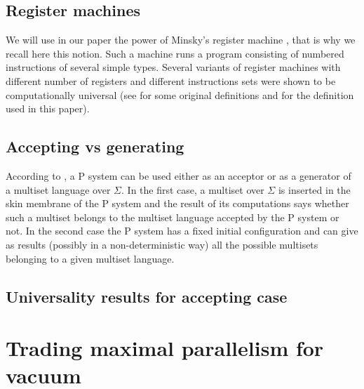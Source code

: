 \documentclass[a4paper,10pt]{article}
\begin{document}


\subsection{Register machines} %
\label{sub:register_machines}
  We will use in our paper the power of Minsky's register machine \cite{Ionescu:jucs_10_5:on_p_systems_with}, that is why we recall here this notion. Such a machine runs a program consisting of numbered instructions of several simple types. Several variants of register machines with different number of registers and different instructions sets were shown to be computationally universal (see \cite{Ibarra:2005:SPS:2111772.2111880} for some original definitions and \cite{Khrisna03threeuniversality} for the definition used in this paper).

  
  

\subsection{Accepting vs generating} %
\label{sub:accepting_vs_generating}
  According to \cite{Barbuti:2010:MSW:1946067.1946081}, a P system can be used either as an acceptor or as a generator of a multiset language over $\Sigma$. In the first case, a multiset over $\Sigma$ is inserted in the skin membrane of the P system and the result of its computations says whether such a multiset belongs to the multiset language accepted by the P system or not. In the second case the P system has a fixed initial configuration and can give as results (possibly in a non-deterministic way) all the possible multisets belonging to a given multiset language.


\subsection{Universality results for accepting case} %
\label{sub:universality_results_for_accepting_case}




\section{Trading maximal parallelism for vacuum}
\label{sec:vacuum}
\end{document}
